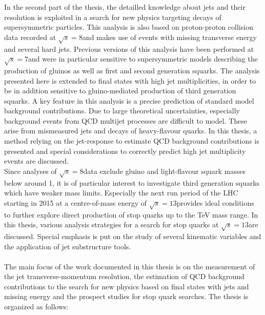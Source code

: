 In the second part of the thesis, the detailled knowledge about jets and their resolution is exploited in a search for new physics targeting decays of supersymmetric particles. This analysis is also based on proton-proton collision data recorded at $\sqrt{s} = 8$\tev and makes use of events with missing transverse energy and several hard jets. Previous versions of this analysis have been performed at $\sqrt{s} = 7$\tev and were in particular sensitive to supersymmetric models describing the production of gluinos as well as first and second generation squarks. The analysis presented here is extended to final states with high jet multiplicities, in order to be in addition sensitive to gluino-mediated production of third generation squarks. A key feature in this analysis is a precise prediction of standard model background contributions. Due to large theoretical uncertainties, especially background events from QCD multijet processes are difficult to model. These arise from mismeasured jets and decays of heavy-flavour quarks. In this thesis, a method relying on the jet-\pt response to estimate QCD background contributions is presented and special considerations to correctly predict high jet multiplicity events are discussed.  \\
Since analyses of $\sqrt{s} = 8$\tev data exclude gluino and light-flavour squark masses below around 1\tev, it is of particular interest to investigate third generation squarks which have weaker mass limits. Especially the next run period of the LHC starting in 2015 at a centre-of-mass energy of $\sqrt{s} = 13$\tev provides ideal conditions to further explore direct production of stop quarks up to the TeV mass range. In this thesis, various analysis strategies for a search for stop quarks at $\sqrt{s} = 13$\tev are discussed. Special emphasis is put on the study of several kinematic variables and the application of jet substructure tools. \\ 
\\
The main focus of the work documented in this thesis is on the measurement of the jet transverse-momentum resolution, the estimation of QCD background contributions to the search for new physics based on final states with jets and missing energy and the prospect studies for stop quark searches. The thesis is organized as follows:
